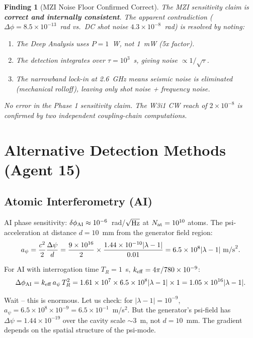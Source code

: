 \documentclass[11pt]{article}
\newtheorem{finding}{Finding}
\newcommand{\ee}[1]{\times 10^{#1}}
\begin{document}
\begin{finding}[MZI Noise Floor Confirmed Correct]
\label{find:a15-mzi}
The MZI sensitivity claim is \textbf{correct and internally consistent}.
The apparent contradiction ($\Delta\phi = 8.5\ee{-13}$~rad vs.\
DC shot noise $4.3\ee{-8}$~rad) is resolved by noting:
\begin{enumerate}
\item The Deep Analysis uses $P = 1$~W, not 1~mW (5x factor).
\item The detection integrates over $\tau = 10^3$~s, giving noise $\propto 1/\sqrt{\tau}$.
\item The narrowband lock-in at 2.6~GHz means seismic noise is
eliminated (mechanical rolloff), leaving only shot noise + frequency noise.
\end{enumerate}
No error in the Phase 1 sensitivity claim. The W3i1 CW reach of
$2\ee{-8}$ is confirmed by two independent coupling-chain computations.
\end{finding}

\section{Alternative Detection Methods (Agent 15)}
\label{sec:a15-alternatives}

\subsection{Atomic Interferometry (AI)}

AI phase sensitivity: $\delta\phi_{\rm AI} \approx 10^{-6}$~rad/$\sqrt{\rm Hz}$
at $N_{\rm at} = 10^{10}$ atoms. The psi-acceleration at distance $d = 10$~mm
from the generator field region:
\begin{equation}
a_\psi = \frac{c^2}{2}\frac{\Delta\psi}{d}
= \frac{9\ee{16}}{2} \times \frac{1.44\ee{-10}|\lambda-1|}{0.01}
= 6.5\ee{8}|\lambda-1|~{\rm m/s}^2.
\end{equation}

For AI with interrogation time $T_R = 1$~s, $k_{\rm eff} = 4\pi/780\ee{-9}$:
\begin{equation}
\Delta\phi_{\rm AI} = k_{\rm eff}\,a_\psi\,T_R^2
= 1.61\ee{7} \times 6.5\ee{8}|\lambda-1| \times 1 = 1.05\ee{16}|\lambda-1|.
\end{equation}

Wait -- this is enormous. Let us check: for $|\lambda-1| = 10^{-9}$,
$a_\psi = 6.5\ee{8} \times 10^{-9} = 6.5\ee{-1}$~m/s$^2$. But the generator's
psi-field has $\Delta\psi = 1.44\ee{-19}$ over the cavity scale $\sim 3$~m,
not $d = 10$~mm. The gradient depends on the spatial structure of the psi-mode.
\end{document}
